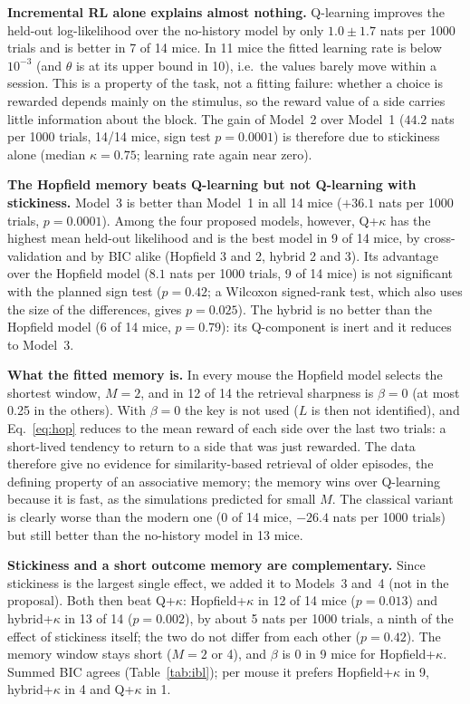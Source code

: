 \documentclass[10pt,a4paper]{article}
\begin{document}
\textbf{Incremental RL alone explains almost nothing.} Q-learning improves the held-out log-likelihood over
the no-history model by only $1.0\pm1.7$ nats per 1000 trials and is better in 7 of 14 mice. In 11 mice the
fitted learning rate is below $10^{-3}$ (and $\theta$ is at its upper bound in 10), i.e.\ the values barely move
within a session. This is a property of the task, not a fitting failure: whether a choice is rewarded depends
mainly on the stimulus, so the reward value of a side carries little information about the block. The gain of Model~2 over Model~1 ($44.2$ nats per 1000 trials, 14/14 mice, sign test $p=0.0001$) is
therefore due to stickiness alone (median $\kappa=0.75$; learning rate again near zero).

\textbf{The Hopfield memory beats Q-learning but not Q-learning with stickiness.} Model~3 is better than
Model~1 in all 14 mice ($+36.1$ nats per 1000 trials, $p=0.0001$). Among the four proposed models, however,
Q+$\kappa$ has the highest mean held-out likelihood and is the best model in 9 of 14 mice, by cross-validation
and by BIC alike (Hopfield 3 and 2, hybrid 2 and 3). Its advantage over the Hopfield model ($8.1$ nats per 1000
trials, 9 of 14 mice) is not significant with the planned sign test ($p=0.42$; a Wilcoxon signed-rank test,
which also uses the size of the differences, gives $p=0.025$). The hybrid is no better than the Hopfield model
(6 of 14 mice, $p=0.79$): its Q-component is inert and it reduces to Model~3.

\textbf{What the fitted memory is.} In every mouse the Hopfield model selects the shortest window, $M=2$, and
in 12 of 14 the retrieval sharpness is $\beta=0$ (at most 0.25 in the others). With $\beta=0$ the key is not
used ($L$ is then not identified), and Eq.~\ref{eq:hop} reduces to the mean reward of each side over the last
two trials: a short-lived tendency to return to a side that was just rewarded. The data therefore give no
evidence for similarity-based retrieval of older episodes, the defining property of an associative memory; the
memory wins over Q-learning because it is fast, as the simulations predicted for small $M$. The classical
variant is clearly worse than the modern one (0 of 14 mice, $-26.4$ nats per 1000 trials) but still better than
the no-history model in 13 mice.

\textbf{Stickiness and a short outcome memory are complementary.} Since stickiness is the largest single effect,
we added it to Models~3 and~4 (not in the proposal). Both then beat Q+$\kappa$: Hopfield+$\kappa$ in 12 of 14
mice ($p=0.013$) and hybrid+$\kappa$ in 13 of 14 ($p=0.002$), by about 5 nats per 1000 trials, a ninth of the
effect of stickiness itself; the two do not differ from each other ($p=0.42$). The memory window stays short
($M=2$ or 4), and $\beta$ is 0 in 9 mice for Hopfield+$\kappa$. Summed BIC agrees (Table~\ref{tab:ibl}); per mouse it prefers
Hopfield+$\kappa$ in 9, hybrid+$\kappa$ in 4 and Q+$\kappa$ in 1.
\end{document}
